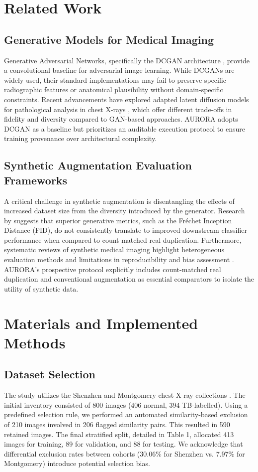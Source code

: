 \documentclass[11pt]{article}
\begin{document}
\section{Related Work}
\subsection{Generative Models for Medical Imaging}
Generative Adversarial Networks, specifically the DCGAN architecture \cite{radford2015}, provide a convolutional baseline for adversarial image learning. While DCGANs are widely used, their standard implementations may fail to preserve specific radiographic features or anatomical plausibility without domain-specific constraints. Recent advancements have explored adapted latent diffusion models for pathological analysis in chest X-rays \cite{moris2024}, which offer different trade-offs in fidelity and diversity compared to GAN-based approaches. AURORA adopts DCGAN as a baseline but prioritizes an auditable execution protocol to ensure training provenance over architectural complexity.

\subsection{Synthetic Augmentation Evaluation Frameworks}
A critical challenge in synthetic augmentation is disentangling the effects of increased dataset size from the diversity introduced by the generator. Research by \citet{pink2026} suggests that superior generative metrics, such as the Fréchet Inception Distance (FID), do not consistently translate to improved downstream classifier performance when compared to count-matched real duplication. Furthermore, systematic reviews of synthetic medical imaging highlight heterogeneous evaluation methods and limitations in reproducibility and bias assessment \cite{folguera2026}. AURORA’s prospective protocol explicitly includes count-matched real duplication and conventional augmentation as essential comparators to isolate the utility of synthetic data.

\section{Materials and Implemented Methods}

\subsection{Dataset Selection}
The study utilizes the Shenzhen and Montgomery chest X-ray collections \cite{jaeger2014}. The initial inventory consisted of 800 images (406 normal, 394 TB-labelled). Using a predefined selection rule, we performed an automated similarity-based exclusion of 210 images involved in 206 flagged similarity pairs. This resulted in 590 retained images. The final stratified split, detailed in Table 1, allocated 413 images for training, 89 for validation, and 88 for testing. We acknowledge that differential exclusion rates between cohorts (30.06\% for Shenzhen vs. 7.97\% for Montgomery) introduce potential selection bias.
\end{document}
